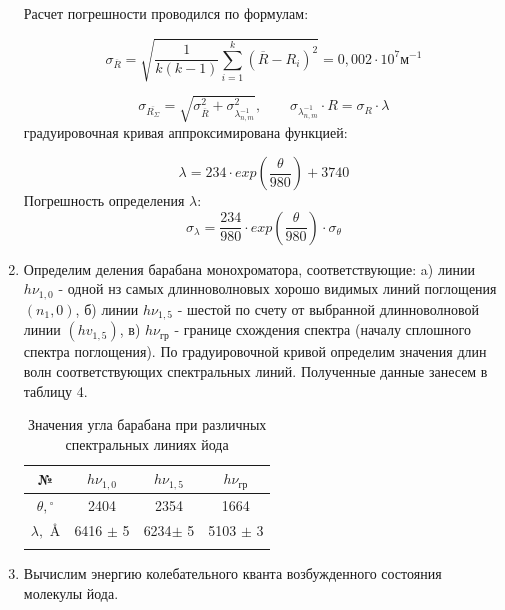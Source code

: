 \documentclass[a4paper, 12pt]{article}%
\begin{document}
\begin{enumerate}
		 Расчет погрешности  проводился по формулам:
		
		\begin{equation}
			 \sigma_{\overline{R}} = \sqrt{\frac{1}{k(k-1)} \sum_{i = 1}^{k} (\overline{R} - {R_i})^2} = 0,002 \cdot 10^7\text{м}^{-1} 
		\end{equation}
		
		\begin{equation} 
			\sigma_{\overline{R_{\Sigma}}} = \sqrt{ \sigma_{\overline{R}} ^2 + \sigma_{\lambda_{n,m}^{-1}}^2 }, \qquad
			\sigma_{\lambda_{n,m}^{-1}}\cdot R = \sigma_{R} \cdot \lambda
		\end{equation}
	градуировочная кривая аппроксимирована функцией:
	
	\begin{equation}\label{}
		\lambda = 234 \cdot exp (\frac{\theta}{980}) + 3740
	\end{equation}
	Погрешность определения $\lambda$:
	\begin{equation}\label{}
		\sigma_{\lambda} = \frac{234}{980}\cdot exp(\frac{\theta}{980}) \cdot\sigma_{\theta}
	\end{equation}
	
		
		\item Определим деления барабана монохроматора, соответствующие:
		a) линии $h \nu_{1,0}$ - одной нз самых длинноволновых хорошо видимых линий поглощения $\left(n_1, 0\right)$,
		б) линии $h \nu_{1,5}$ - шестой по счету от выбранной длинноволновой линии $\left(h v_{1,5}\right)$,
		в) $h \nu_{\text{гр}}$ - границе схождения спектра (началу сплошного спектра поглощения). По градуировочной кривой определим значения длин волн соответствующих спектральных линий. Полученные данные занесем в таблицу 4.
		
		\begin{longtable}{|c|c|c|c|}
			\hline
			№ & $h \nu_{1,0}$ & $h \nu_{1,5}$ & $h \nu_{\text{гр}}$  \\ \hline
			$\theta, {}^\circ$ & 2404 & 2354 & 1664 \\ \hline
			$\lambda, $ \AA & 6416 $\pm $ 5 & 6234$\pm $ 5 & 5103 $\pm $ 3 \\ \hline
			
			\caption{Значения угла барабана при различных спектральных линиях йода}
		\end{longtable}
		
		
		\item Вычислим энергию колебательного кванта возбужденного состояния молекулы йода.
		

\end{enumerate}
\end{document}
